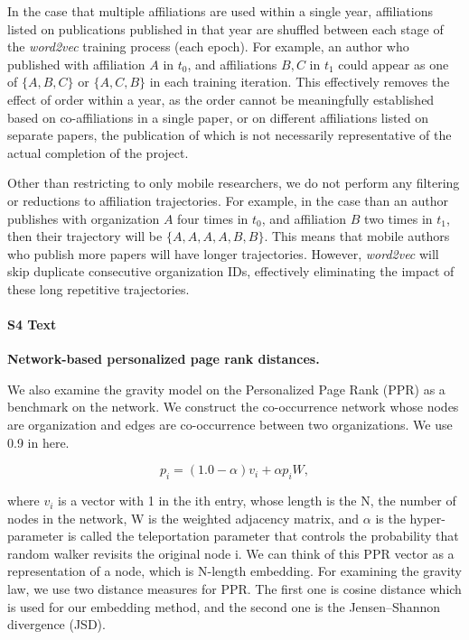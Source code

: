 \documentclass[12pt]{article} %
\begin{document}
In the case that multiple affiliations are used within a single year, affiliations listed on publications published in that year are shuffled between each stage of the \textit{word2vec} training process (each epoch). 
For example, an author who published with affiliation $A$ in $t_{0}$, and affiliations $B, C$ in $t_{1}$ could appear as one of $\{A, B, C\}$ or $\{A, C, B\}$ in each training iteration. 
This effectively removes the effect of order within a year, as the order cannot be meaningfully established based on co-affiliations in a single paper, or on different affiliations listed on separate papers, the publication of which is not necessarily representative of the actual completion of the project. 

Other than restricting to only mobile researchers, we do not perform any filtering or reductions to affiliation trajectories.
For example, in the case than an author publishes with organization $A$ four times in $t_{0}$, and affiliation $B$ two times in $t_{1}$, then their trajectory will be $\{A, A, A, A, B, B\}$. 
This means that mobile authors who publish more papers will have longer trajectories.
However, \textit{word2vec} will skip duplicate consecutive organization IDs, effectively eliminating the impact of these long repetitive trajectories. 




%
\paragraph*{S4 Text}
\label{si:text:ppr_dist}
{\bf Network-based personalized page rank distances.}


We also examine the gravity model on the Personalized Page Rank (PPR)\autocite{jeh2003scaling} as a benchmark on the network. We construct the co-occurrence network whose nodes are organization and edges are co-occurrence between two organizations. We use 0.9 in here.

\begin{equation}
	\label{eq:ppr}
	p_i = (1.0 - \alpha) v_i + \alpha p_i W,
\end{equation}

where $v_i$ is a vector with 1 in the ith entry, whose length is the N, the number of nodes in the network, W is the weighted adjacency matrix, and $\alpha$ is the hyper-parameter is called the teleportation parameter that controls the probability that random walker revisits the original node i. We can think of this PPR vector as a representation of a node, which is N-length embedding. For examining the gravity law, we use two distance measures for PPR. The first one is cosine distance which is used for our embedding method, and the second one is the Jensen–Shannon divergence (JSD).
\end{document}
